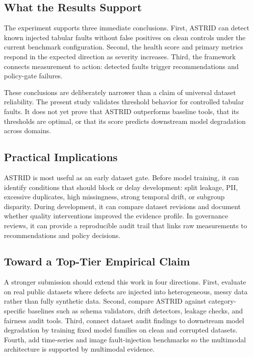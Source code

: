 \documentclass[runningheads]{llncs}
\begin{document}
\subsection{What the Results Support}

The experiment supports three immediate conclusions. First, ASTRID can detect
known injected tabular faults without false positives on clean controls under the
current benchmark configuration. Second, the health score and primary metrics
respond in the expected direction as severity increases. Third, the framework
connects measurement to action: detected faults trigger recommendations and
policy-gate failures.

These conclusions are deliberately narrower than a claim of universal dataset
reliability. The present study validates threshold behavior for controlled
tabular faults. It does not yet prove that ASTRID outperforms baseline tools, that
its thresholds are optimal, or that its score predicts downstream model
degradation across domains.

\subsection{Practical Implications}

ASTRID is most useful as an early dataset gate. Before model training, it can
identify conditions that should block or delay development: split leakage, PII,
excessive duplicates, high missingness, strong temporal drift, or subgroup
disparity. During development, it can compare dataset revisions and document
whether quality interventions improved the evidence profile. In governance
reviews, it can provide a reproducible audit trail that links raw measurements to
recommendations and policy decisions.

\subsection{Toward a Top-Tier Empirical Claim}

A stronger submission should extend this work in four directions. First, evaluate
on real public datasets where defects are injected into heterogeneous, messy data
rather than fully synthetic data. Second, compare ASTRID against category-specific
baselines such as schema validators, drift detectors, leakage checks, and
fairness audit tools. Third, connect dataset audit findings to downstream model
degradation by training fixed model families on clean and corrupted datasets.
Fourth, add time-series and image fault-injection benchmarks so the multimodal
architecture is supported by multimodal evidence.
\end{document}
